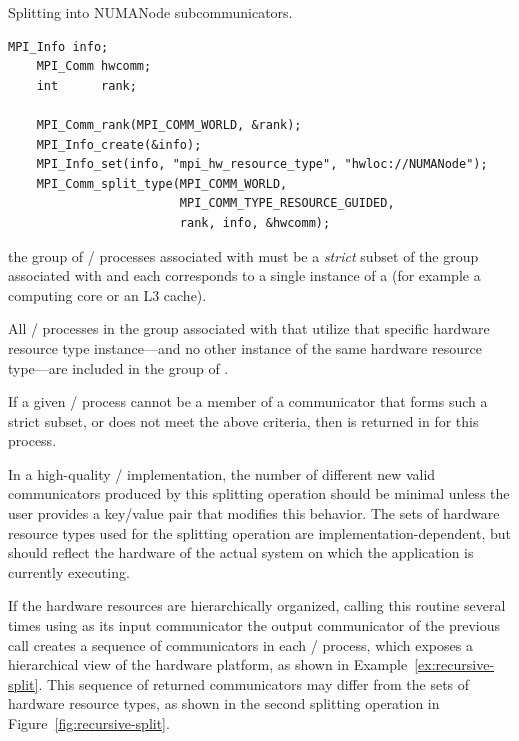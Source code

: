 \begin{description}
\begin{example}
\label{ex:hw-based split2}
%
Splitting  into NUMANode subcommunicators.
\begin{lstlisting}[language={[MPI]C}]
    MPI_Info info;
    MPI_Comm hwcomm;
    int      rank;

    MPI_Comm_rank(MPI_COMM_WORLD, &rank);
    MPI_Info_create(&info);
    MPI_Info_set(info, "mpi_hw_resource_type", "hwloc://NUMANode");
    MPI_Comm_split_type(MPI_COMM_WORLD,
                        MPI_COMM_TYPE_RESOURCE_GUIDED,
                        rank, info, &hwcomm);
\end{lstlisting}
\end{example}


\item[\mpiconstmain{MPI\_COMM\_TYPE\_HW\_UNGUIDED}:]the group of \MPI/ processes associated
  with  must be a \emph{strict} subset of the group associated with  and
  each  corresponds to a single instance of a 
  (for example a computing core or an L3 cache).

  All \MPI/ processes in the group associated with  that utilize that specific hardware resource
type instance---and no other instance of the same hardware resource type---are included in the group of
  .
  
  If a given \MPI/ process cannot be a member of a communicator that forms such a strict subset,
  or does not meet the above criteria, then  is returned in 
  for this process.

  \begin{implementors}
    In a high-quality \MPI/ implementation, the number of different new valid communicators
     produced by this splitting operation should be minimal unless the user
    provides a key/value pair that modifies this behavior. The sets of hardware resource types
    used for the splitting operation are implementation-dependent, but should reflect the hardware
    of the actual system on which the application is currently executing.
  \end{implementors}

  \begin{rationale}
    If the hardware resources are hierarchically organized, calling this routine several times
    using as its input communicator  the output communicator  of the
    previous call creates a sequence of  communicators in each \MPI/ process, which
    exposes a hierarchical view of the hardware platform, as shown in Example~\ref{ex:recursive-split}.
    This sequence of returned  communicators may differ from the sets of hardware
    resource types, as shown in the second splitting operation in Figure~\ref{fig:recursive-split}.
  \end{rationale}


\end{description}
